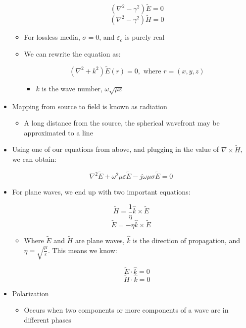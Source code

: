 \begin{itemize}
\begin{itemize}
        $$(\nabla^2-\gamma^2)\tilde{E}=0$$
        $$(\nabla^2-\gamma^2)\tilde{H}=0$$

      \item For lossless media, $\sigma=0$, and $\varepsilon_c$ is purely real

      \item We can rewrite the equation as:

        $$(\nabla^2+k^2)\tilde{E}(r)=0,\text{ where }r=(x,y,z)$$

        \begin{itemize}

          \item $k$ is the wave number, $\omega\sqrt{\mu\varepsilon}$

        \end{itemize}

    \end{itemize}

  \item Mapping from source to field is known as radiation

    \begin{itemize}

      \item A long distance from the source, the spherical wavefront may be approximated to a line

    \end{itemize}

  \item Using one of our equations from above, and plugging in the value of $\nabla\times\tilde{H}$, we can obtain:

    $$\nabla^2\tilde{E}+\omega^2\mu\varepsilon\tilde{E}-j\omega\mu\sigma\tilde{E}=0$$

  \item For plane waves, we end up with two important equations:

    $$\tilde{H}=\frac{1}{\eta}\hat{k}\times\tilde{E}$$
    $$\tilde{E}=-\eta\hat{k}\times\tilde{E}$$

    \begin{itemize}

      \item Where $\tilde{E}$ and $\tilde{H}$ are plane waves, $\hat{k}$ is the direction of propagation, and $\eta=\sqrt{\frac{\mu}{\varepsilon}}$. This means we know:

        $$\tilde{E}\cdot\hat{k}=0$$
        $$\tilde{H}\cdot\hat{k}=0$$

    \end{itemize}

  \item Polarization

    \begin{itemize}

      \item Occurs when two components or more components of a wave are in different phases

    \end{itemize}

\end{itemize}



